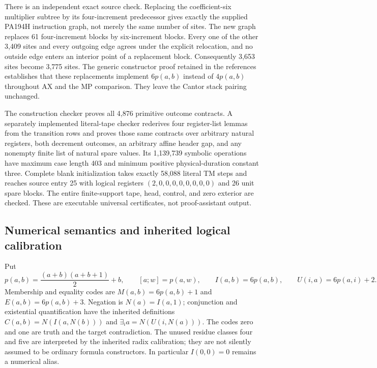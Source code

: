 There is an independent exact source check.  Replacing the coefficient-six
multiplier subtree by its four-increment predecessor gives exactly the
supplied PA194H instruction graph, not merely the same number of sites.
The new graph replaces 61 four-increment blocks by six-increment blocks.
Every one of the other 3,409 sites and every outgoing edge agrees under
the explicit relocation, and no outside edge enters an interior point of
a replacement block.  Consequently 3,653 sites become 3,775 sites.
The generic constructor proof retained in the references establishes that
these replacements implement $6p(a,b)$ instead of $4p(a,b)$ throughout AX
and the MP comparison.  They leave the Cantor stack pairing unchanged.

The construction checker proves all 4,876 primitive outcome contracts.
A separately implemented literal-tape checker rederives four register-list
lemmas from the transition rows and proves those same contracts over
arbitrary natural registers, both decrement outcomes, an arbitrary affine
header gap, and any nonempty finite list of natural spare values.  Its
1,139,739 symbolic operations have maximum case length 403 and minimum
positive physical-duration constant three.  Complete blank initialization
takes exactly 58,088 literal TM steps and reaches source entry 25 with
logical registers $(2,0,0,0,0,0,0,0,0)$ and 26 unit spare blocks.  The entire
finite-support tape, head, control, and zero exterior are checked.
These are executable universal certificates, not proof-assistant output.

\subsection{Numerical semantics and inherited logical calibration}

Put
\[
 p(a,b)=\frac{(a+b)(a+b+1)}2+b,\qquad [a;w]=p(a,w),\qquad
 I(a,b)=6p(a,b),\qquad U(i,a)=6p(a,i)+2.
\]
Membership and equality codes are $M(a,b)=6p(a,b)+1$ and
$E(a,b)=6p(a,b)+3$.  Negation is $N(a)=I(a,1)$; conjunction and existential
quantification have the inherited definitions
$C(a,b)=N(I(a,N(b)))$ and $\exists_i a=N(U(i,N(a)))$.
The codes zero and one are truth and the target contradiction.
The unused residue classes four and five are interpreted by the inherited
radix calibration; they are not silently assumed to be ordinary formula
constructors.  In particular $I(0,0)=0$ remains a numerical alias.

